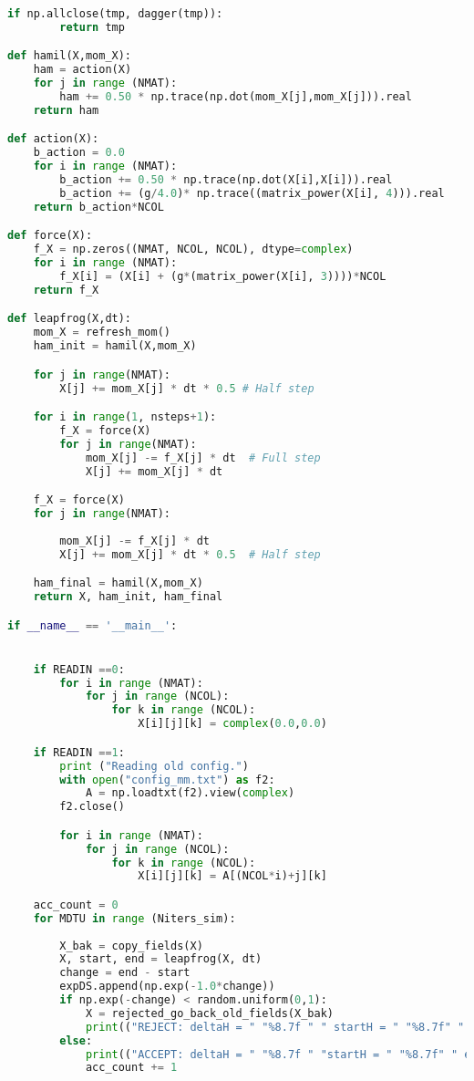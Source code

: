 \begin{footnotesize}
\begin{lstlisting}[language=Python]
    if np.allclose(tmp, dagger(tmp)):
        return tmp

def hamil(X,mom_X):
    ham = action(X) 
    for j in range (NMAT):
        ham += 0.50 * np.trace(np.dot(mom_X[j],mom_X[j])).real 
    return ham  

def action(X):
    b_action = 0.0 
    for i in range (NMAT):
        b_action += 0.50 * np.trace(np.dot(X[i],X[i])).real   
        b_action += (g/4.0)* np.trace((matrix_power(X[i], 4))).real
    return b_action*NCOL

def force(X): 
    f_X = np.zeros((NMAT, NCOL, NCOL), dtype=complex)
    for i in range (NMAT): 
        f_X[i] = (X[i] + (g*(matrix_power(X[i], 3))))*NCOL
    return f_X

def leapfrog(X,dt):
    mom_X = refresh_mom()
    ham_init = hamil(X,mom_X)

    for j in range(NMAT):
        X[j] += mom_X[j] * dt * 0.5 # Half step 

    for i in range(1, nsteps+1):
        f_X = force(X)
        for j in range(NMAT):
            mom_X[j] -= f_X[j] * dt  # Full step 
            X[j] += mom_X[j] * dt

    f_X = force(X)
    for j in range(NMAT):
        
        mom_X[j] -= f_X[j] * dt
        X[j] += mom_X[j] * dt * 0.5  # Half step 

    ham_final = hamil(X,mom_X)
    return X, ham_init, ham_final

if __name__ == '__main__':


    if READIN ==0:
        for i in range (NMAT): 
            for j in range (NCOL):
                for k in range (NCOL):
                    X[i][j][k] = complex(0.0,0.0) 

    if READIN ==1:
        print ("Reading old config.")
        with open("config_mm.txt") as f2:
            A = np.loadtxt(f2).view(complex)
        f2.close()

        for i in range (NMAT):
            for j in range (NCOL):
                for k in range (NCOL):
                    X[i][j][k] = A[(NCOL*i)+j][k] 

    acc_count = 0
    for MDTU in range (Niters_sim):
        
        X_bak = copy_fields(X) 
        X, start, end = leapfrog(X, dt) 
        change = end - start  
        expDS.append(np.exp(-1.0*change)) 
        if np.exp(-change) < random.uniform(0,1):
            X = rejected_go_back_old_fields(X_bak)
            print(("REJECT: deltaH = " "%8.7f " " startH = " "%8.7f" " endH = " "%8.7f" % (change, start, end)))
        else:   
            print(("ACCEPT: deltaH = " "%8.7f " "startH = " "%8.7f" " endH = " "%8.7f" % (change, start, end)))
            acc_count += 1 


\end{lstlisting}
\end{footnotesize}
